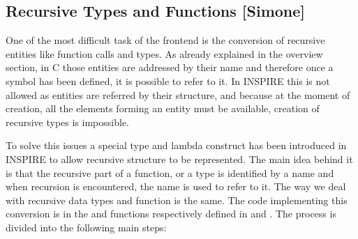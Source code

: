 \subsection{Recursive Types and Functions [Simone]}
\label{sec:Insieme.Frontend.Recursion}

One of the most difficult task of the frontend is the conversion of recursive
entities like function calls and types. As already explained in the overview
section, in C those entities are addressed by their name and therefore once a
symbol has been defined, it is possible to refer to it. In INSPIRE this is not
allowed as entities are referred by their structure, and because at the moment
of creation, all the elements forming an entity must be available, creation of
recursive types is impossible. 

To solve this issues a special type and lambda construct has been introduced in
INSPIRE to allow recursive structure to be represented. The main idea behind it
is that the recursive part of a function, or a type is identified by a name and
when recursion is encountered, the name is used to refer to it. The way we deal
with recursive data types and function is the same. The code implementing this
conversion is in the  and 
functions respectively defined in  and
. The process is divided into the following
main steps:

